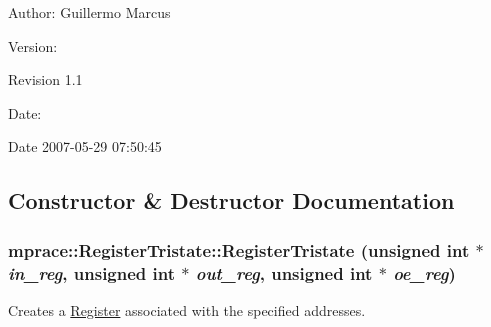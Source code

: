 \begin{Desc}
\item[Author:]Guillermo Marcus \end{Desc}
\begin{Desc}
\item[Version:]\begin{Desc}
\item[Revision]1.1 \end{Desc}
\end{Desc}
\begin{Desc}
\item[Date:]\begin{Desc}
\item[Date]2007-05-29 07:50:45 \end{Desc}
\end{Desc}




\subsection{Constructor \& Destructor Documentation}
\hypertarget{classmprace_1_1RegisterTristate_a0}{
\subsubsection[RegisterTristate]{\setlength{\rightskip}{0pt plus 5cm}mprace::Register\-Tristate::Register\-Tristate (unsigned int $\ast$ {\em in\_\-reg}, unsigned int $\ast$ {\em out\_\-reg}, unsigned int $\ast$ {\em oe\_\-reg})}}
\label{classmprace_1_1RegisterTristate_a0}


Creates a \hyperlink{classmprace_1_1Register}{Register} associated with the specified addresses. 

